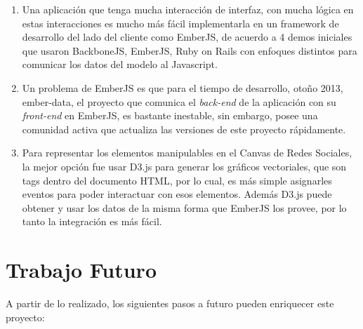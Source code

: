   \begin{enumerate}
    \item Una aplicación que tenga mucha interacción de interfaz, con mucha lógica en estas interacciones es mucho más fácil implementarla en un framework de desarrollo del lado del cliente como EmberJS, de acuerdo a 4 demos iniciales que usaron BackboneJS, EmberJS, Ruby on Rails con enfoques distintos para comunicar los datos del modelo al Javascript.
    
    \item Un problema de EmberJS es que para el tiempo de desarrollo, otoño 2013, ember-data, el proyecto que comunica el \emph{back-end} de la aplicación con su \emph{front-end} en EmberJS, es bastante inestable, sin embargo, posee una comunidad activa que actualiza las versiones de este proyecto rápidamente.
    
    \item Para representar los elementos manipulables en el Canvas de Redes Sociales, la mejor opción fue usar D3.js para generar los gráficos vectoriales, que son tags dentro del documento HTML, por lo cual, es más simple asignarles eventos para poder interactuar con esos elementos. Además D3.js puede obtener y usar los datos de la misma forma que EmberJS los provee, por lo tanto la integración es más fácil.
  \end{enumerate}




\section{Trabajo Futuro} %
\label{sec:trabajo_futuro}

A partir de lo realizado, los siguientes pasos a futuro pueden enriquecer este proyecto:

